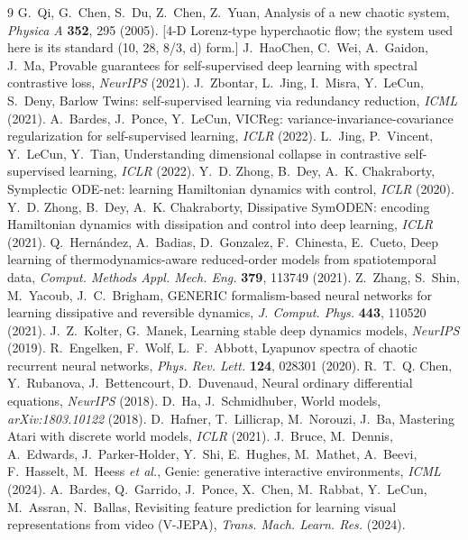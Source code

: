 \documentclass[journal]{IEEEtran}
\begin{document}
\begin{thebibliography}{9}
 G.~Qi, G.~Chen, S.~Du, Z.~Chen, Z.~Yuan, Analysis of a new chaotic system, \emph{Physica A} \textbf{352}, 295 (2005). [4-D Lorenz-type hyperchaotic flow; the system used here is its standard (10, 28, 8/3, d) form.]
 J.~HaoChen, C.~Wei, A.~Gaidon, J.~Ma, Provable guarantees for self-supervised deep learning with spectral contrastive loss, \emph{NeurIPS} (2021).
 J.~Zbontar, L.~Jing, I.~Misra, Y.~LeCun, S.~Deny, Barlow Twins: self-supervised learning via redundancy reduction, \emph{ICML} (2021).
 A.~Bardes, J.~Ponce, Y.~LeCun, VICReg: variance-invariance-covariance regularization for self-supervised learning, \emph{ICLR} (2022).
 L.~Jing, P.~Vincent, Y.~LeCun, Y.~Tian, Understanding dimensional collapse in contrastive self-supervised learning, \emph{ICLR} (2022).
 Y.~D. Zhong, B.~Dey, A.~K. Chakraborty, Symplectic ODE-net: learning Hamiltonian dynamics with control, \emph{ICLR} (2020).
 Y.~D. Zhong, B.~Dey, A.~K. Chakraborty, Dissipative SymODEN: encoding Hamiltonian dynamics with dissipation and control into deep learning, \emph{ICLR} (2021).
 Q.~Hern\'andez, A.~Badias, D.~Gonzalez, F.~Chinesta, E.~Cueto, Deep learning of thermodynamics-aware reduced-order models from spatiotemporal data, \emph{Comput. Methods Appl. Mech. Eng.} \textbf{379}, 113749 (2021).
 Z.~Zhang, S.~Shin, M.~Yacoub, J.~C.~Brigham, GENERIC formalism-based neural networks for learning dissipative and reversible dynamics, \emph{J. Comput. Phys.} \textbf{443}, 110520 (2021).
 J.~Z.~Kolter, G.~Manek, Learning stable deep dynamics models, \emph{NeurIPS} (2019).
 R.~Engelken, F.~Wolf, L.~F.~Abbott, Lyapunov spectra of chaotic recurrent neural networks, \emph{Phys. Rev. Lett.} \textbf{124}, 028301 (2020).
 R.~T.~Q. Chen, Y.~Rubanova, J.~Bettencourt, D.~Duvenaud, Neural ordinary differential equations, \emph{NeurIPS} (2018).
 D.~Ha, J.~Schmidhuber, World models, \emph{arXiv:1803.10122} (2018).
 D.~Hafner, T.~Lillicrap, M.~Norouzi, J.~Ba, Mastering Atari with discrete world models, \emph{ICLR} (2021).
 J.~Bruce, M.~Dennis, A.~Edwards, J.~Parker-Holder, Y.~Shi, E.~Hughes, M.~Mathet, A.~Beevi, F.~Hasselt, M.~Heess \emph{et al.}, Genie: generative interactive environments, \emph{ICML} (2024).
 A.~Bardes, Q.~Garrido, J.~Ponce, X.~Chen, M.~Rabbat, Y.~LeCun, M.~Assran, N.~Ballas, Revisiting feature prediction for learning visual representations from video (V-JEPA), \emph{Trans. Mach. Learn. Res.} (2024).

\end{thebibliography}
\end{document}
